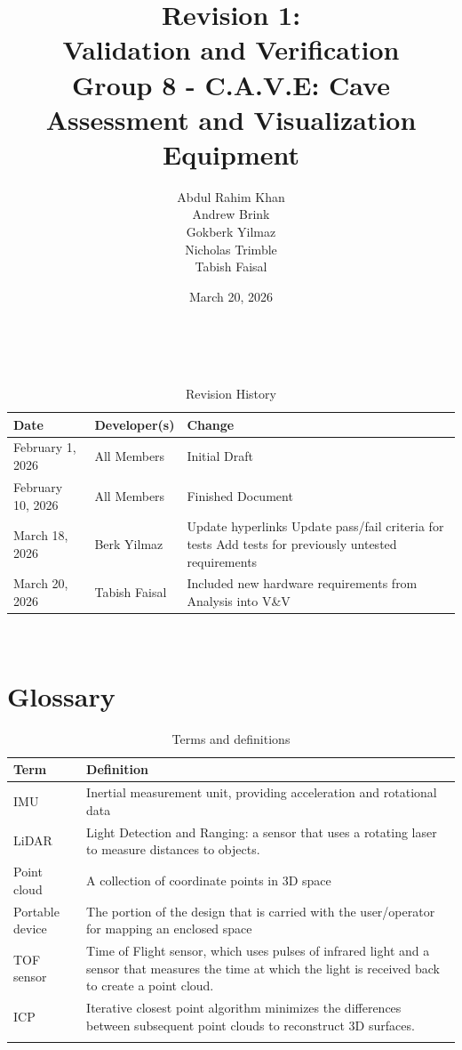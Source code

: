 \documentclass[11pt]{article}
\title{\textbf{Revision 1: \\Validation and Verification \\ \large Group 8 - C.A.V.E: Cave Assessment and Visualization Equipment}}
\author{Abdul Rahim Khan \\ Andrew Brink \\ Gokberk Yilmaz \\ Nicholas Trimble \\ Tabish Faisal}
\date{March 20, 2026}
\begin{document}
	
	\maketitle
	~\newpage
	\renewcommand{\thetable}{\Roman{table}}
	\setcounter{table}{0}
	\begin{table}[hp]
		\caption{Revision History} \label{TblRevisionHistory}
		\begin{tabularx}{\textwidth}{llX}
			\toprule
			\textbf{Date} & \textbf{Developer(s)} & \textbf{Change}\\
			\midrule
			February 1, 2026 & All Members & Initial Draft\\
			\midrule
			February 10, 2026 & All Members & Finished Document\\
            \midrule
            March 18, 2026 & Berk Yilmaz & Update hyperlinks \newline Update pass/fail criteria for tests \newline Add tests for previously untested requirements \\
            \midrule
            March 20, 2026 & Tabish Faisal & Included new hardware requirements from Analysis into V\&V \\
			\bottomrule
		\end{tabularx}
	\end{table}
	
	~\newpage
	\section*{Glossary}
		\setcounter{table}{1}
	\begin{table}[hp]
		\centering
		\begin{tabularx}{\textwidth}{X p{}}
			\toprule
			\textbf{Term} & \textbf{Definition} \\
			\midrule
			IMU & Inertial measurement unit, providing acceleration and rotational data \\
			\addlinespace
			LiDAR & Light Detection and Ranging: a sensor that uses a rotating laser to measure distances to objects. \\
			\addlinespace
			Point cloud & A collection of coordinate points in 3D space \\
			\addlinespace
			Portable device & The portion of the design that is carried with the user/operator for mapping an enclosed space \\
			\addlinespace
			TOF sensor & Time of Flight sensor, which uses pulses of infrared light and a sensor that measures the time at which the light is received back to create a point cloud. \\
			\addlinespace
			ICP & Iterative closest point algorithm minimizes the differences between subsequent point clouds to reconstruct 3D surfaces. \\
			\bottomrule
			\caption{Terms and definitions}
		\end{tabularx}
	\end{table}
	~\newpage
	
\end{document}
